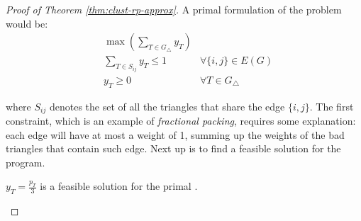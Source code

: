 \begin{proof}[Proof of Theorem \ref{thm:clust-rp-approx}]
    A primal formulation of the problem would be:
    \begin{align*}\label{lp:clust-primal}
        &\max \left( \sum_{T \in G_\triangle} y_T \right)   & \\
        &\sum_{T \in S_{ij}} y_T \leq 1                     & \forall \{i, j\} \in E(G) \\
        &y_T \geq 0                                         & \forall T \in G_\triangle 
    \end{align*}

    where $S_{ij}$ denotes the set of all the triangles that share the edge $\{i, j\}$. The first constraint, which is an example of \textit{fractional packing}, requires some explanation: each edge will have at most a weight of 1, summing up the weights of the bad triangles that contain such edge. Next up is to find a feasible solution for the program.
    
    \begin{lemma}\label{l:clust-4}
        $y_T = \frac{p_T}{3}$ is a feasible solution for the primal \lp.
    \end{lemma}






\end{proof}
